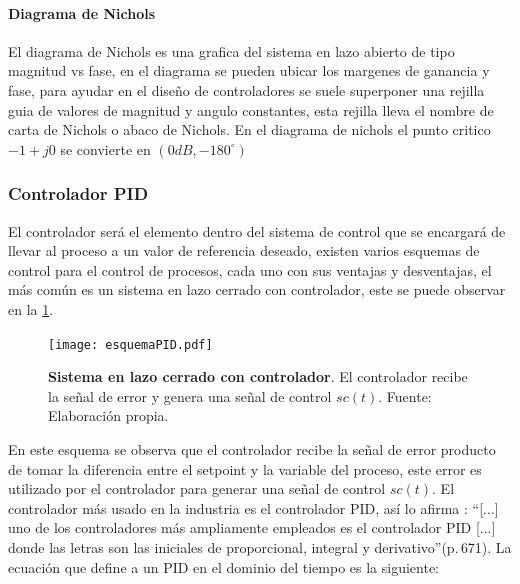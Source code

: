             \paragraph{Diagrama de Nichols}
                
                El diagrama de Nichols es una grafica del sistema en lazo abierto de tipo magnitud vs fase, en el diagrama se pueden ubicar los margenes de ganancia y fase, para ayudar en el diseño de controladores se suele superponer una rejilla guia de valores de magnitud y angulo constantes, esta rejilla lleva el nombre de carta de Nichols o abaco de Nichols. En el diagrama de nichols el punto critico $-1 + j0$ se convierte en $(0dB, -180^\circ)$

                \clearpage

        \subsubsection{Controlador PID}

            El controlador será el elemento dentro del sistema de control que se encargará de llevar al proceso a un valor de referencia deseado, existen varios esquemas de control para el control de procesos, cada uno con sus ventajas y desventajas, el más común es un sistema en lazo cerrado con controlador, este se puede observar en la \cref{fig:esquemaPID}.

            \begin{figure}[htb]
                \centering
                \texttt{[image: esquemaPID.pdf]}
                \caption[Ejemplo de un sistema en lazo cerrado con controlador]{\textbf{Sistema en lazo cerrado con controlador}. El controlador recibe la señal de error y genera una señal de control $sc(t)$. Fuente: Elaboración propia.} 
                \label{fig:esquemaPID}
            \end{figure}

            En este esquema se observa que el controlador recibe la señal de error producto de tomar la diferencia entre el setpoint y la variable del proceso, este error es utilizado por el controlador para generar una señal de control $sc(t)$. El controlador más usado en la industria es el controlador PID, así lo afirma \textcite{kuo1996sistemas}: \enquote{[...] uno de los controladores más ampliamente empleados es el controlador PID [...] donde las letras son las iniciales de proporcional, integral y derivativo}(p.$\,$671). La ecuación que define a un PID en el dominio del tiempo es la siguiente:

